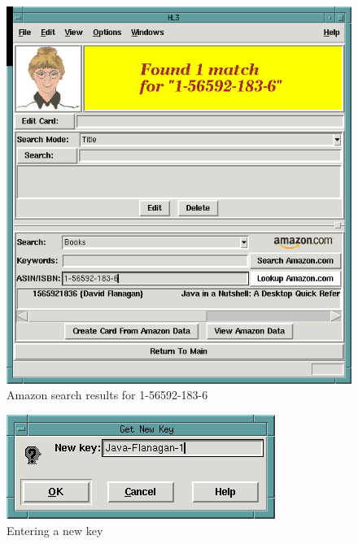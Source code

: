 \begin{figure}[hpt]
\begin{centering}
\includegraphics[width=5in]{AmazonSearchJavaNutshell.png}
\caption{Amazon search results for 1-56592-183-6}
\label{fig:tut:Amazonsearchjavanut}
\end{centering}
\end{figure}
\begin{figure}[hpt]
\begin{centering}
\includegraphics{EnterNewKey.png}
\caption{Entering a new key}
\label{fig:tut:newkeyjava1}
\end{centering}
\end{figure}
